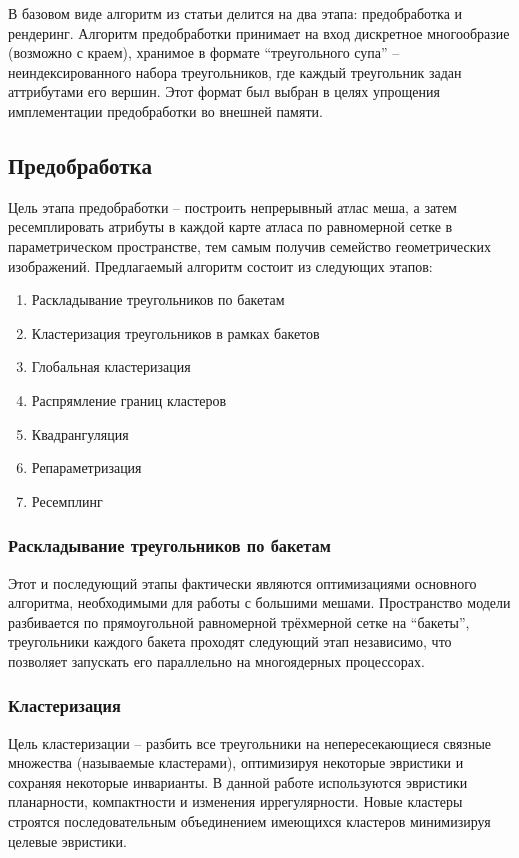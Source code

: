 \documentclass[12pt]{extarticle}
\begin{document}
В базовом виде алгоритм из статьи \cite{niski2007multi} делится на два этапа: предобработка и рендеринг. Алгоритм предобработки принимает на вход дискретное многообразие (возможно с краем), хранимое в формате ``треугольного супа'' -- неиндексированного набора треугольников, где каждый треугольник задан аттрибутами его вершин. Этот формат был выбран в целях упрощения имплементации предобработки во внешней памяти.

\subsection{Предобработка}
Цель этапа предобработки -- построить непрерывный атлас меша, а затем ресемплировать атрибуты в каждой карте атласа по равномерной сетке в параметрическом пространстве, тем самым получив семейство геометрических изображений. Предлагаемый алгоритм состоит из следующих этапов:
\begin{enumerate}
\item Раскладывание треугольников по бакетам
\item Кластеризация треугольников в рамках бакетов
\item Глобальная кластеризация
\item Распрямление границ кластеров
\item Квадрангуляция
\item Репараметризация
\item Ресемплинг
\end{enumerate}

\subsubsection{Раскладывание треугольников по бакетам}
Этот и последующий этапы фактически являются оптимизациями основного алгоритма, необходимыми для работы с большими мешами. Пространство модели разбивается по прямоугольной равномерной трёхмерной сетке на ``бакеты'', треугольники каждого бакета проходят следующий этап независимо, что позволяет запускать его параллельно на многоядерных процессорах.

\subsubsection{Кластеризация}
Цель кластеризации -- разбить все треугольники на непересекающиеся связные множества (называемые кластерами), оптимизируя некоторые эвристики и сохраняя некоторые инварианты. В данной работе используются эвристики планарности, компактности и изменения иррегулярности. Новые кластеры строятся последовательным объединением имеющихся кластеров минимизируя целевые эвристики.
\end{document}
